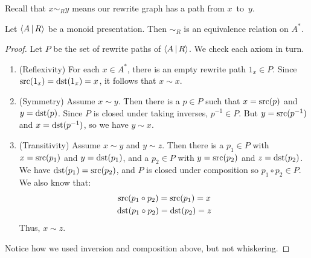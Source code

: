 \documentclass[../generics]{subfiles}
\begin{document}
Recall that $x\sim_R y$ means our rewrite graph has a path from $x$~to~$y$.

\begin{proposition}
Let $\langle A\,|\,R\rangle$ be a monoid presentation. Then $\sim_R$ is an equivalence relation on $A^*$.
\end{proposition}
\begin{proof}
Let $P$ be the set of rewrite paths of $\langle A\,|\,R\rangle$. We check each axiom in turn.
\begin{enumerate}
\item {}(Reflexivity) For each $x\in A^*$, there is an empty rewrite path $1_x\in P$. Since $\operatorname{src}(1_x)=\operatorname{dst}(1_x)=x$, it follows that $x\sim x$.
\item {}(Symmetry) Assume $x\sim y$. Then there is a $p\in P$ such that $x=\operatorname{src}(p)$ and $y=\operatorname{dst}(p)$. Since $P$ is closed under taking inverses, $p^{-1}\in P$. But $y=\operatorname{src}(p^{-1})$ and $x=\operatorname{dst}(p^{-1})$, so we have $y\sim x$.
\item {}(Transitivity) Assume $x\sim y$ and $y\sim z$. Then there is a $p_1\in P$ with $x=\operatorname{src}(p_1)$ and $y=\operatorname{dst}(p_1)$, and a $p_2\in P$ with $y=\operatorname{src}(p_2)$ and $z=\operatorname{dst}(p_2)$. We have $\operatorname{dst}(p_1)=\operatorname{src}(p_2)$, and $P$ is closed under composition so $p_1\circ p_2 \in P$. We also know that:
\begin{gather*}
\operatorname{src}(p_1\circ p_2)=\operatorname{src}(p_1)=x\\
\operatorname{dst}(p_1\circ p_2)=\operatorname{dst}(p_2)=z
\end{gather*}
Thus, $x\sim z$.
\end{enumerate}
Notice how we used inversion and composition above, but not whiskering.
\end{proof}
\end{document}
